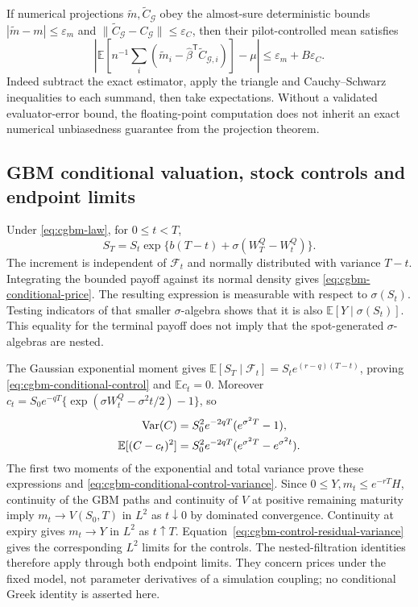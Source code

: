 \documentclass[11pt]{article}
\begin{document}
If numerical projections $\widetilde m,\widetilde C_{\mathcal G}$ obey
the almost-sure deterministic bounds
$|\widetilde m-m|\leq\varepsilon_m$ and
$\|\widetilde C_{\mathcal G}-C_{\mathcal G}\|\leq\varepsilon_C$,
then their pilot-controlled mean satisfies
\begin{equation}
 \left|\mathbb E\!\left[
 n^{-1}\sum_i(\widetilde m_i-
 \widehat\beta^{\mathsf T}\widetilde C_{\mathcal G,i})\right]-\mu\right|
 \leq\varepsilon_m+B\varepsilon_C.
 \label{eq:cgbm-projection-evaluator-bias}
\end{equation}
Indeed subtract the exact estimator, apply the triangle and
Cauchy--Schwarz inequalities to each summand, then take expectations.
Without a validated evaluator-error bound, the floating-point computation
does not inherit an exact numerical unbiasedness guarantee from the
projection theorem.

\subsection{GBM conditional valuation, stock controls and endpoint limits}

Under \eqref{eq:cgbm-law}, for $0\leq t<T$,
\begin{equation}
 S_T=S_t\exp\{b(T-t)+\sigma(W_T^Q-W_t^Q)\}.
 \label{eq:cgbm-markov-split}
\end{equation}
The increment is independent of $\mathcal F_t$ and normally distributed
with variance $T-t$. Integrating the bounded payoff against its normal
density gives \eqref{eq:cgbm-conditional-price}. The resulting expression
is measurable with respect to $\sigma(S_t)$. Testing indicators of that
smaller $\sigma$-algebra shows that it is also
$\mathbb E[Y\mid\sigma(S_t)]$. This equality for the terminal payoff
does not imply that the spot-generated $\sigma$-algebras are nested.

The Gaussian exponential moment gives
$\mathbb E[S_T\mid\mathcal F_t]=S_t e^{(r-q)(T-t)}$, proving
\eqref{eq:cgbm-conditional-control} and $\mathbb E c_t=0$.
Moreover
$c_t=S_0e^{-qT}\{\exp(\sigma W_t^Q-\sigma^2t/2)-1\}$, so
\begin{align}
 \operatorname{Var}(C)&=S_0^2e^{-2qT}(e^{\sigma^2T}-1),\notag\\
 \mathbb E[(C-c_t)^2]
 &=S_0^2e^{-2qT}(e^{\sigma^2T}-e^{\sigma^2t}).
 \label{eq:cgbm-control-residual-variance}
\end{align}
The first two moments of the exponential and total variance prove these
expressions and \eqref{eq:cgbm-conditional-control-variance}.
Since $0\leq Y,m_t\leq e^{-rT}H$, continuity of the GBM paths and
continuity of $V$ at positive remaining maturity imply
$m_t\to V(S_0,T)$ in $L^2$ as $t\downarrow0$ by dominated convergence.
Continuity at expiry gives $m_t\to Y$ in $L^2$ as $t\uparrow T$.
Equation~\eqref{eq:cgbm-control-residual-variance} gives the corresponding
$L^2$ limits for the controls. The nested-filtration identities therefore
apply through both endpoint limits. They concern prices under the
fixed model, not parameter derivatives of a simulation coupling; no
conditional Greek identity is asserted here.
\end{document}
